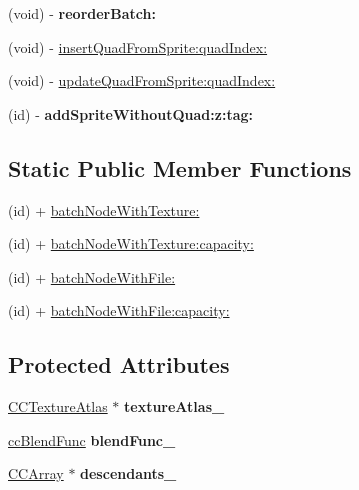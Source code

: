 \begin{DoxyCompactItemize}
\item 
\hypertarget{interface_c_c_sprite_batch_node_abc27925ca94daee7f5d9c4a8ce2e3cfb}{(void) -\/ {\bfseries reorder\-Batch\-:}}\label{interface_c_c_sprite_batch_node_abc27925ca94daee7f5d9c4a8ce2e3cfb}

\item 
(void) -\/ \hyperlink{interface_c_c_sprite_batch_node_a1196340b02843ef9192bb60f48d6cb55}{insert\-Quad\-From\-Sprite\-:quad\-Index\-:}
\item 
(void) -\/ \hyperlink{interface_c_c_sprite_batch_node_aef3eced49e43ba406b6a06ac0eae2683}{update\-Quad\-From\-Sprite\-:quad\-Index\-:}
\item 
\hypertarget{interface_c_c_sprite_batch_node_a4ce47e9db1274bfd274ad64e44e54333}{(id) -\/ {\bfseries add\-Sprite\-Without\-Quad\-:z\-:tag\-:}}\label{interface_c_c_sprite_batch_node_a4ce47e9db1274bfd274ad64e44e54333}

\end{DoxyCompactItemize}
\subsection*{Static Public Member Functions}
\begin{DoxyCompactItemize}
\item 
(id) + \hyperlink{interface_c_c_sprite_batch_node_a87f7f453933fb0b5cae54c8efbdb222b}{batch\-Node\-With\-Texture\-:}
\item 
(id) + \hyperlink{interface_c_c_sprite_batch_node_a3c89e1d0b1a37b65a08efad91a538691}{batch\-Node\-With\-Texture\-:capacity\-:}
\item 
(id) + \hyperlink{interface_c_c_sprite_batch_node_a84235224df7e41e195e44b3d8e653218}{batch\-Node\-With\-File\-:}
\item 
(id) + \hyperlink{interface_c_c_sprite_batch_node_ac7b99e67696aa808806825cffced26de}{batch\-Node\-With\-File\-:capacity\-:}
\end{DoxyCompactItemize}
\subsection*{Protected Attributes}
\begin{DoxyCompactItemize}
\item 
\hypertarget{interface_c_c_sprite_batch_node_ad3101574887b4b2f04b24c6be695d037}{\hyperlink{interface_c_c_texture_atlas}{C\-C\-Texture\-Atlas} $\ast$ {\bfseries texture\-Atlas\-\_\-}}\label{interface_c_c_sprite_batch_node_ad3101574887b4b2f04b24c6be695d037}

\item 
\hypertarget{interface_c_c_sprite_batch_node_a3e77c1194ad7fdb3bbd9efe158d47158}{\hyperlink{cc_types_8h_a8c19c6f67219ecc0a6e4740cc046008d}{cc\-Blend\-Func} {\bfseries blend\-Func\-\_\-}}\label{interface_c_c_sprite_batch_node_a3e77c1194ad7fdb3bbd9efe158d47158}

\item 
\hypertarget{interface_c_c_sprite_batch_node_a70d55dccde7666d11695d56ea1b9323e}{\hyperlink{interface_c_c_array}{C\-C\-Array} $\ast$ {\bfseries descendants\-\_\-}}\label{interface_c_c_sprite_batch_node_a70d55dccde7666d11695d56ea1b9323e}

\end{DoxyCompactItemize}
